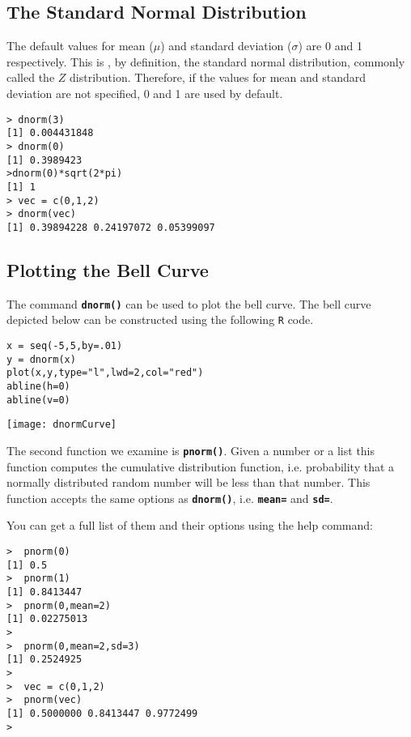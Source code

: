 \documentclass[a4paper,12pt]{article}
\begin{document}
\subsection{The Standard Normal Distribution}
The default values for mean ($\mu$) and standard deviation ($\sigma$) are 0 and 1 respectively. This is , by definition, the standard normal distribution, commonly called the $Z$ distribution. Therefore, if the values for mean and standard deviation are not specified, 0 and 1 are used by default.
\begin{verbatim}
> dnorm(3)
[1] 0.004431848
> dnorm(0)
[1] 0.3989423
>dnorm(0)*sqrt(2*pi)
[1] 1
> vec = c(0,1,2)
> dnorm(vec)
[1] 0.39894228 0.24197072 0.05399097
\end{verbatim}
\subsection{Plotting the Bell Curve}
The command \texttt{\textbf{dnorm()}} can be used to plot the bell curve. The bell curve depicted below can be constructed using the following \texttt{R} code.
\begin{framed}
\begin{verbatim}
x = seq(-5,5,by=.01)
y = dnorm(x) 
plot(x,y,type="l",lwd=2,col="red")
abline(h=0)
abline(v=0)
\end{verbatim}
\end{framed}
 \begin{center}
 \texttt{[image: dnormCurve]}
 \end{center}
 

The second function we examine is \texttt{\textbf{pnorm()}}. Given a number or a list this function computes the cumulative distribution function, i.e. probability that a normally distributed random number will be less than that number. This function accepts the same options as \texttt{\textbf{dnorm()}}, i.e. \texttt{\textbf{mean=}} and \texttt{\textbf{sd=}}.


You can get a full list of them and their options using the help command:

\begin{verbatim}
>  pnorm(0)
[1] 0.5
>  pnorm(1)
[1] 0.8413447
>  pnorm(0,mean=2)
[1] 0.02275013
>
>  pnorm(0,mean=2,sd=3)
[1] 0.2524925
>
>  vec = c(0,1,2)         
>  pnorm(vec)
[1] 0.5000000 0.8413447 0.9772499
>
\end{verbatim}
\end{document}
